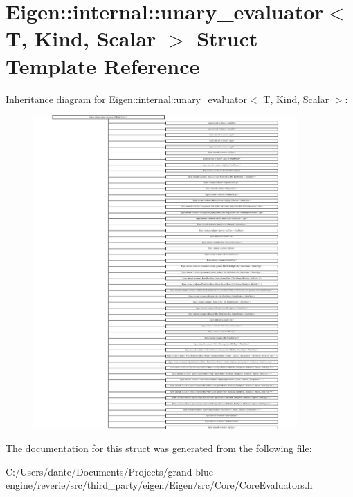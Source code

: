 \hypertarget{struct_eigen_1_1internal_1_1unary__evaluator}{}\section{Eigen\+::internal\+::unary\+\_\+evaluator$<$ T, Kind, Scalar $>$ Struct Template Reference}
\label{struct_eigen_1_1internal_1_1unary__evaluator}
Inheritance diagram for Eigen\+::internal\+::unary\+\_\+evaluator$<$ T, Kind, Scalar $>$\+:\begin{figure}[H]
\begin{center}
\leavevmode
\includegraphics[height=12.000000cm]{struct_eigen_1_1internal_1_1unary__evaluator}
\end{center}
\end{figure}


The documentation for this struct was generated from the following file\+:\begin{DoxyCompactItemize}
\item 
C\+:/\+Users/dante/\+Documents/\+Projects/grand-\/blue-\/engine/reverie/src/third\+\_\+party/eigen/\+Eigen/src/\+Core/Core\+Evaluators.\+h\end{DoxyCompactItemize}
